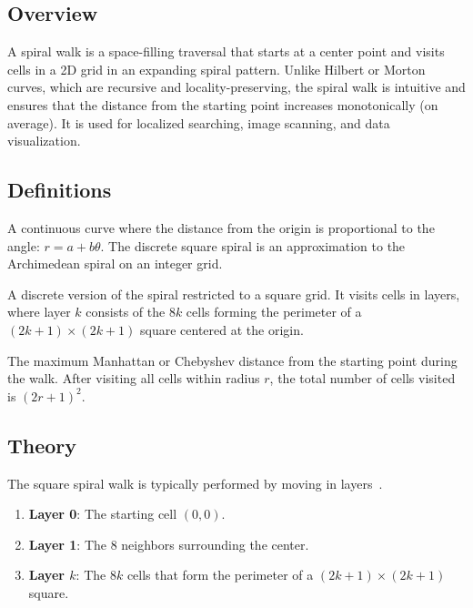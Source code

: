 \subsection{Overview}
A spiral walk is a space-filling traversal that starts at a center point and visits cells in a 2D grid in an expanding spiral pattern. Unlike Hilbert or Morton curves, which are recursive and locality-preserving, the spiral walk is intuitive and ensures that the distance from the starting point increases monotonically (on average). It is used for localized searching, image scanning, and data visualization.

\subsection{Definitions}
\begin{definition}\label{def:archimedean_spiral}
A continuous curve where the distance from the origin is proportional to the angle: $r = a + b\theta$. The discrete square spiral is an approximation to the Archimedean spiral on an integer grid.
\end{definition}

\begin{definition}\label{def:square_spiral}
A discrete version of the spiral restricted to a square grid. It visits cells in layers, where layer $k$ consists of the $8k$ cells forming the perimeter of a $(2k+1) \times (2k+1)$ square centered at the origin.
\end{definition}

\begin{definition}\label{def:spiral_radius}
The maximum Manhattan or Chebyshev distance from the starting point during the walk. After visiting all cells within radius $r$, the total number of cells visited is $(2r+1)^2$.
\end{definition}

\subsection{Theory}
The square spiral walk is typically performed by moving in layers~\cite{stein1964}.
\begin{enumerate}
    \item \textbf{Layer 0}: The starting cell $(0,0)$.
    \item \textbf{Layer 1}: The 8 neighbors surrounding the center.
    \item \textbf{Layer $k$}: The $8k$ cells that form the perimeter of a $(2k+1) \times (2k+1)$ square.
\end{enumerate}

